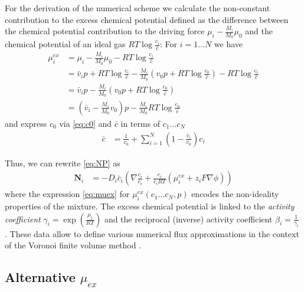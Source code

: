 \documentclass[12pt,oneside,reqno]{amsart}
\numberwithin{equation}{section}
\begin{document}
For the derivation of the numerical scheme we calculate the non-constant
contribution to the excess chemical potential defined as the difference between the chemical potential
contribution to the driving force $\mu_i - \frac{M_i}{M_0}\mu_0$ and the chemical potential of an ideal gas
$RT \log \frac{c_i}{\bar c}$:
For $i=1\dots N$ we have
\begin{align}
  \mu_i^{ex} &=  \mu_i - \frac{M_i}{M_0} \mu_0  - RT \log \frac{c_i}{\bar c} \nonumber\\
             &= \bar v_ip +  RT \log \frac{c_i}{\bar c}  -\frac{M_i}{M_0}\left(  v_0p + RT \log \frac{c_0}{\bar c}\right)  - RT \log \frac{c_i}{\bar c} \nonumber\\
            &= \bar v_ip  -\frac{M_i}{M_0}\left(  v_0p + RT \log \frac{c_0}{\bar c}\right)\nonumber\\
            &= \left(\bar v_i-\frac{M_i}{M_0}v_0\right)p - \frac{M_i}{M_0}RT\log \frac{c_0}{\bar c} \label{eq:muex}
\end{align}
and express $c_0$ via \eqref{eq:c0} and $\bar c$ in terms of $c_1\dots c_N$
\begin{align*}
  \bar c &%
          = \frac{1}{v_0} + \sum_{i=1}^N \left(1- \frac{\bar v_i}{v_0}\right) c_i 
\end{align*}

Thus, we can rewrite \eqref{eq:NP}  as 
\begin{align}\label{eq:flux}
  \mathbf N_i &= - D_i\bar c_i \left(\nabla \frac{c_i}{\bar c_i} + \frac{c_i}{\bar c_iRT} (\mu_i^{ex} + z_i F \nabla \phi) \right)
\end{align}
where the expression \eqref{eq:muex} for $\mu_i^{ex}(c_1\dots c_N, p)$  encodes the non-ideality properties of the mixture.
The excess chemical potential is linked to the \textit{activity coefficient} $\gamma_i=\exp(\frac{\mu_i}{RT})$ and the
reciprocal (inverse) activity coefficient $\beta_i=\frac1{\gamma_i}$  \cite{Fuhrmann2015}.
These data allow to define various numerical flux approximations in the context of the Voronoi finite volume
method \cite{Fuhrmann2015,GaudeulFuhrmannNM2022}.

\subsection{Alternative $\mu_{ex}$}
\end{document}
